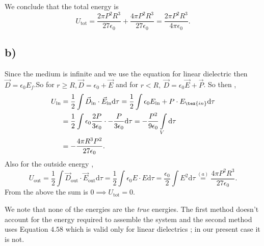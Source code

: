 \documentclass[12pt]{article}
\newcommand{\ep}{\epsilon}
\newcommand{\dr}{\mathrm{d}}
\theoremstyle{definition}
\theoremstyle{definition}
\theoremstyle{definition}
\theoremstyle{definition}
\theoremstyle{definition}
\theoremstyle{example}
\theoremstyle{note}
\theoremstyle{remark}
\theoremstyle{example}
\begin{document}
				We conclude that the total energy is 
				$$ U_{\text{tot}} = \frac{2\pi P^{2} R^{3}}{27 \ep_{0}} +  \frac{4 \pi P^{2}R^{3}}{27 \ep_{0}} = \frac{2 \pi P^{2} R^{3}}{4 \pi \ep_{0}}.$$
			\subsection*{b) }
				Since the medium is infinite and we use the equation for linear dielectric then $ \vec{D} = \ep_{0} E_{f}$.So for $r \ge R, \vec{D} = \ep_{0} + \vec{E}$ and for $r < R,  \ \vec{D} = \ep_{0} \vec{E}+ \vec{P}$. So then ,
				\begin{align*}  
				U_{\text{in}} &= \frac12 \int \vec{D}_{\text{in}} \cdot \vec{E}_{\text{in}} \dr \tau = \frac12 \int \ep_{0} E_{\text{in}} + P \cdot E_{\tex{in}} \dr \tau \\ &= \frac12 \int \ep_{0} \frac{2P}{3 \ep_{0}} \cdot - \frac{P}{3 \ep_{0}} \dr\tau = -\frac{P^{2}}{9 \ep_{0}} \int\limits_{V} \dr \tau \\ &= -\frac{4 \pi R^{3} P^{2}}{27 \ep_{0}}.
				\end{align*}
				Also for the outside energy , 
				$$ U_{\text{out}} = \frac12 \int \vec{D }_{\text{out}} \cdot \vec{E}_{\text{out}} \dr \tau  = \frac12 \int \ep_{0} E \cdot E \dr \tau = \frac{\ep_{0}}{2} \int E^{2} \dr \tau \overset{(a)}{=}\frac{4 \pi P^{2}R^{3}}{27 \ep_{0}} .$$
				From the above the sum is $0 \implies U_{\text{tot}} = 0$.
				
				\noindent We note that none of the energies are the \textit{true} energies. The first method doesn't account for the energy required to assemble the system and the second method uses Equation $4.58$ which is valid only for linear dielectrics ; in our present case it is not.
\end{document}
